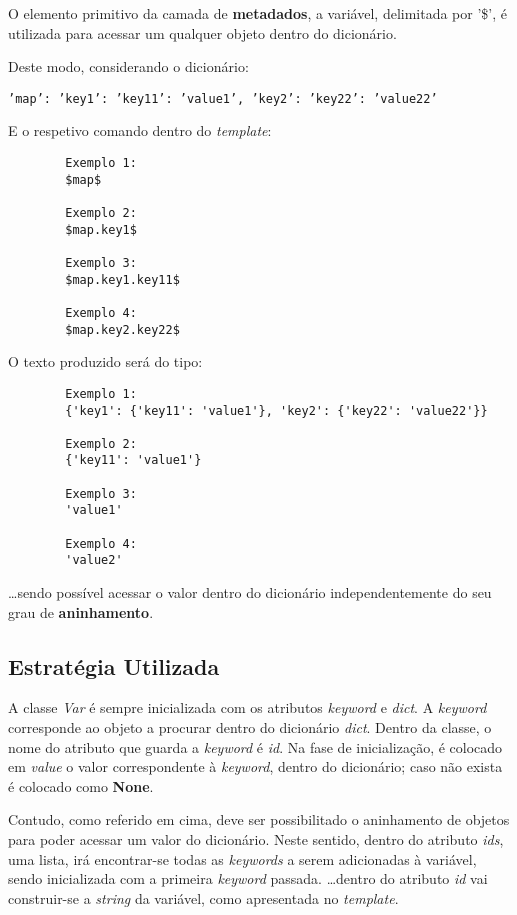 \documentclass[../relatorio.tex]{subfiles}
\begin{document}
    O elemento primitivo da camada de \textbf{metadados},
    a variável, delimitada por '\$', é utilizada para 
    acessar um qualquer objeto dentro do dicionário.

    Deste modo, considerando o dicionário:
    
    \texttt{'map': {'key1': {'key11': 'value1'}, 'key2': {'key22': 'value22'}}}

    E o respetivo comando dentro do \textit{template}:
    \begin{verbatim}
        Exemplo 1:
        $map$

        Exemplo 2:
        $map.key1$

        Exemplo 3:
        $map.key1.key11$

        Exemplo 4:
        $map.key2.key22$
    \end{verbatim}

    O texto produzido será do tipo: 

    \begin{verbatim}
        Exemplo 1:
        {'key1': {'key11': 'value1'}, 'key2': {'key22': 'value22'}}

        Exemplo 2:
        {'key11': 'value1'}

        Exemplo 3:
        'value1'

        Exemplo 4:
        'value2'
    \end{verbatim}

    \dots sendo possível acessar o valor dentro do dicionário
    independentemente do seu grau de \textbf{aninhamento}.

    \subsection{Estratégia Utilizada}
    A classe \textit{Var} é sempre inicializada com os atributos \textit{keyword} e
    \textit{dict}.
    A \textit{keyword} corresponde ao objeto a procurar dentro do dicionário \textit{dict}.
    Dentro da classe, o nome do atributo que guarda a \textit{keyword} é \textit{id}.
    Na fase de inicialização, é colocado em \textit{value} o valor correspondente 
    à \textit{keyword}, dentro do dicionário; caso não exista é colocado como \textbf{None}.

    Contudo, como referido em cima, deve ser possibilitado o aninhamento de objetos para poder 
    acessar um valor do dicionário.
    Neste sentido, dentro do atributo \textit{ids}, uma lista, irá encontrar-se todas 
    as \textit{keywords} a serem adicionadas à variável, sendo inicializada com a primeira
    \textit{keyword} passada.
    \dots dentro do atributo \textit{id} vai construir-se a \textit{string} da variável, como 
    apresentada no \textit{template}.
\end{document}
